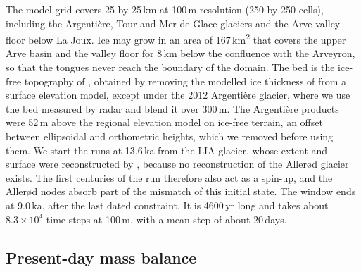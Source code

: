 \documentclass[tc, manuscript]{copernicus}
\begin{document}
The model grid covers 25 by 25\,km at 100\,m resolution (250 by 250 cells), including the Argenti\`ere, Tour and Mer de Glace glaciers and the Arve valley floor below La Joux. Ice may grow in an area of 167\,\unit{km^2} that covers the upper Arve basin and the valley floor for 8\,km below the confluence with the Arveyron, so that the tongues never reach the boundary of the domain. The bed is the ice-free topography of \citet{henz2025}, obtained by removing the modelled ice thickness of \citet{cook2023} from a surface elevation model, except under the 2012 Argenti\`ere glacier, where we use the bed measured by radar and blend it over 300\,m. The Argenti\`ere products were 52\,m above the regional elevation model on ice-free terrain, an offset between ellipsoidal and orthometric heights, which we removed before using them. We start the runs at 13.6\,ka from the LIA glacier, whose extent and surface were reconstructed by \citet{reinthaler2025}, because no reconstruction of the Aller\o d glacier exists. The first centuries of the run therefore also act as a spin-up, and the Aller\o d nodes absorb part of the mismatch of this initial state. The window ends at 9.0\,ka, after the last dated constraint. It is 4600\,yr long and takes about $8.3\times10^4$ time steps at 100\,m, with a mean step of about 20\,days.

\subsection{Present-day mass balance}
\label{sec:calib}
\end{document}
